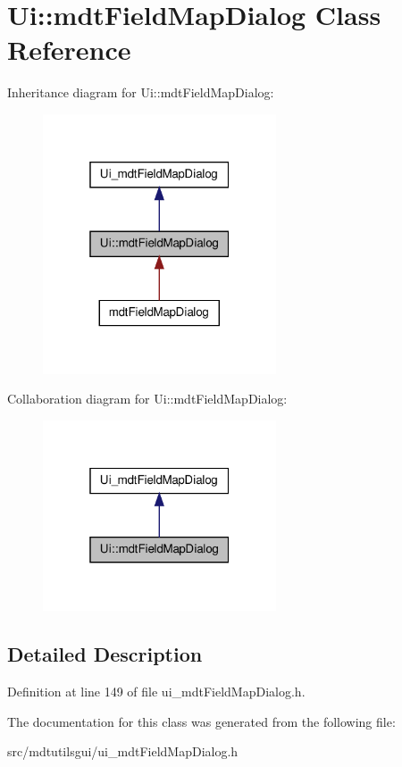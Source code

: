 \hypertarget{class_ui_1_1mdt_field_map_dialog}{
\section{Ui::mdtFieldMapDialog Class Reference}
\label{class_ui_1_1mdt_field_map_dialog}
}


Inheritance diagram for Ui::mdtFieldMapDialog:\nopagebreak
\begin{figure}[H]
\begin{center}
\leavevmode
\includegraphics[width=196pt]{class_ui_1_1mdt_field_map_dialog__inherit__graph}
\end{center}
\end{figure}


Collaboration diagram for Ui::mdtFieldMapDialog:\nopagebreak
\begin{figure}[H]
\begin{center}
\leavevmode
\includegraphics[width=196pt]{class_ui_1_1mdt_field_map_dialog__coll__graph}
\end{center}
\end{figure}


\subsection{Detailed Description}


Definition at line 149 of file ui\_\-mdtFieldMapDialog.h.



The documentation for this class was generated from the following file:\begin{DoxyCompactItemize}
\item 
src/mdtutilsgui/ui\_\-mdtFieldMapDialog.h\end{DoxyCompactItemize}
